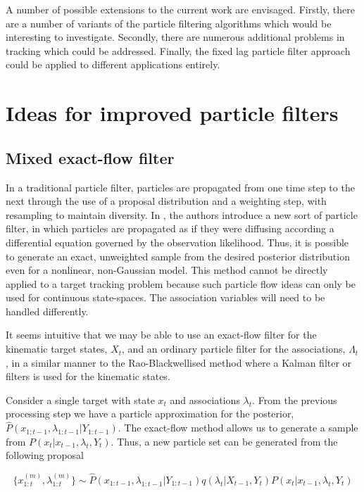 A number of possible extensions to the current work are envisaged. Firstly, there are a number of variants of the particle filtering algorithms which would be interesting to investigate. Secondly, there are numerous additional problems in tracking which could be addressed. Finally, the fixed lag particle filter approach could be applied to different applications entirely.



\section{Ideas for improved particle filters}

\subsection{Mixed exact-flow filter}
In a traditional particle filter, particles are propagated from one time step to the next through the use of a proposal distribution and a weighting step, with resampling to maintain diversity. In \cite{Daum2010}, the authors introduce a new sort of particle filter, in which particles are propagated as if they were diffusing according a differential equation governed by the observation likelihood. Thus, it is possible to generate an exact, unweighted sample from the desired posterior distribution even for a nonlinear, non-Gaussian model. This method cannot be directly applied to a target tracking problem because such particle flow ideas can only be used for continuous state-spaces. The association variables will need to be handled differently.

It seems intuitive that we may be able to use an exact-flow filter for the kinematic target states, $X_t$, and an ordinary particle filter for the associations, $\Lambda_t$, in a similar manner to the Rao-Blackwellised method where a Kalman filter or filters is used for the kinematic states.

Consider a single target with state $x_t$ and associations $\lambda_t$. From the previous processing step we have a particle approximation for the posterior, $\hat{P}(x_{1:t-1}, \lambda_{1:t-1}|Y_{1:t-1})$. The exact-flow method allows us to generate a sample from $P(x_t|x_{t-1}, \lambda_t, Y_t)$. Thus, a new particle set can be generated from the following proposal

\begin{equation}
\{ x_{1:t}^{(m)},\lambda_{1:t}^{(m)} \} \sim \hat{P}(x_{1:t-1}, \lambda_{1:t-1}|Y_{1:t-1}) q(\lambda_t|X_{t-1}, Y_t) P(x_t|x_{t-1}, \lambda_t, Y_t)
\end{equation}

